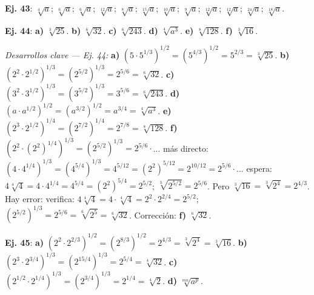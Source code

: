 \documentclass[11pt, letterpaper]{article}
\begin{document}
\medskip

\begin{tcolorbox}[answerbox, title={Bloque K — Raíz de raíz y factor interior}]

\noindent\textbf{Ej. 43}: $\sqrt[4]{a}$;\; $\sqrt[6]{a}$;\; $\sqrt[6]{a}$;\; $\sqrt[12]{a}$;\; $\sqrt[8]{a}$;\; $\sqrt[15]{a}$;\; $\sqrt[10]{a}$;\; $\sqrt[9]{a}$;\; $\sqrt[12]{a}$;\; $\sqrt[12]{a}$;\; $\sqrt[24]{a}$;\; $\sqrt[18]{a}$.

\medskip

\noindent\textbf{Ej. 44}: \textbf{a)} $\sqrt[3]{25}$. \textbf{b)} $\sqrt[6]{32}$. \textbf{c)} $\sqrt[6]{243}$. \textbf{d)} $\sqrt[4]{a^3}$. \textbf{e)} $\sqrt[8]{128}$. \textbf{f)} $\sqrt[3]{16}$.

\medskip

\noindent\textit{Desarrollos clave — Ej. 44:}
\textbf{a)} $(5\cdot5^{1/3})^{1/2}=(5^{4/3})^{1/2}=5^{2/3}=\sqrt[3]{25}$.\quad
\textbf{b)} $(2^2\cdot2^{1/2})^{1/3}=(2^{5/2})^{1/3}=2^{5/6}=\sqrt[6]{32}$.\quad
\textbf{c)} $(3^2\cdot3^{1/2})^{1/3}=(3^{5/2})^{1/3}=3^{5/6}=\sqrt[6]{243}$.\quad
\textbf{d)} $(a\cdot a^{1/2})^{1/2}=(a^{3/2})^{1/2}=a^{3/4}=\sqrt[4]{a^3}$.\quad
\textbf{e)} $(2^3\cdot2^{1/2})^{1/4}=(2^{7/2})^{1/4}=2^{7/8}=\sqrt[8]{128}$.\quad
\textbf{f)} $(2^2\cdot(2^2)^{1/4})^{1/3}=(2^{5/2})^{1/3}=2^{5/6}\cdot$... más directo: $(4\cdot4^{1/4})^{1/3}=(4^{5/4})^{1/3}=4^{5/12}=(2^2)^{5/12}=2^{10/12}=2^{5/6}\cdot$... espera: $4\sqrt[4]{4}=4\cdot4^{1/4}=4^{5/4}=(2^2)^{5/4}=2^{5/2}$; $\sqrt[3]{2^{5/2}}=2^{5/6}$. Pero $\sqrt[3]{16}=\sqrt[3]{2^4}=2^{4/3}$. Hay error: verifica: $4\sqrt[4]{4}=4\cdot\sqrt[4]{4}=2^2\cdot2^{2/4}=2^{5/2}$; $(2^{5/2})^{1/3}=2^{5/6}=\sqrt[6]{2^5}=\sqrt[6]{32}$. Corrección: \textbf{f)} $\sqrt[6]{32}$.

\medskip

\noindent\textbf{Ej. 45}: \textbf{a)} $(2^2\cdot2^{2/3})^{1/2}=(2^{8/3})^{1/2}=2^{4/3}=\sqrt[3]{2^4}=\sqrt[3]{16}$. \textbf{b)} $(2^3\cdot2^{3/4})^{1/3}=(2^{15/4})^{1/3}=2^{5/4}=\sqrt[4]{32}$. \textbf{c)} $(2^{1/2}\cdot2^{1/4})^{1/3}=(2^{3/4})^{1/3}=2^{1/4}=\sqrt[4]{2}$. \textbf{d)} $\sqrt[mn]{a^p}$.
\end{tcolorbox}

\medskip
\end{document}
